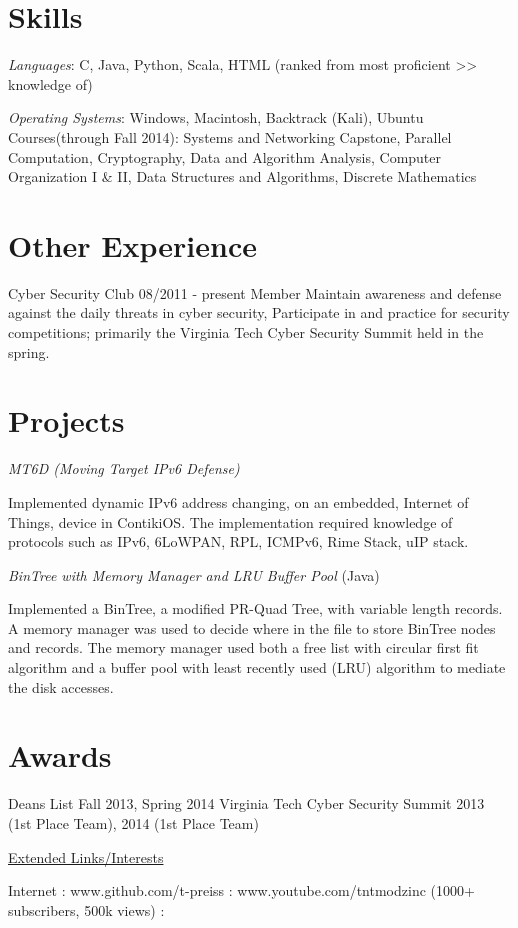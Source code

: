 \documentclass{tpreiss_cv}
\begin{document}
\section{Skills}
\textit{Languages}: C, Java, Python, Scala, HTML (ranked from most proficient >> knowledge of)

\textit{Operating Systems}: Windows, Macintosh, Backtrack (Kali), Ubuntu
Courses(through Fall 2014):    Systems and Networking Capstone, Parallel Computation, Cryptography, Data and Algorithm Analysis, Computer Organization I \& II, Data Structures and Algorithms, Discrete Mathematics

\section{Other Experience} 
Cyber Security Club			           08/2011 - present
Member
Maintain awareness and defense against the daily threats in cyber security, Participate in and practice for security competitions; primarily the Virginia Tech Cyber Security Summit held in the spring.

\section{Projects}
\textit{MT6D (Moving Target IPv6 Defense)}

Implemented dynamic IPv6 address changing, on an embedded, Internet of Things, device in ContikiOS. The implementation required knowledge of protocols such as IPv6, 6LoWPAN, RPL, ICMPv6, Rime Stack, uIP stack.

\textit{BinTree with Memory Manager and LRU Buffer Pool} (Java)

Implemented a BinTree, a modified PR-Quad Tree, with variable length records. A memory manager was used to decide where in the file to store BinTree nodes and records. The memory manager used both a free list with circular first fit algorithm and a buffer pool with least recently used (LRU) algorithm to mediate the disk accesses.

\section{Awards}
Deans List Fall 2013, Spring 2014                  
Virginia Tech Cyber Security Summit 2013 (1st Place Team), 2014 (1st Place Team)

\underline{Extended Links/Interests}

Internet : www.github.com/t-preiss  :  www.youtube.com/tntmodzinc  (1000+ subscribers, 500k views) :
\end{document}
